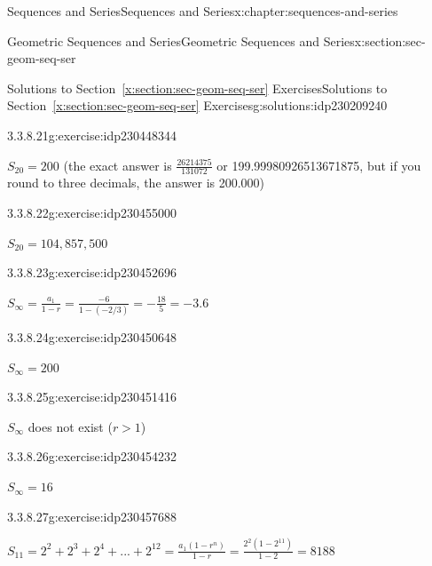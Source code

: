 \documentclass[twoside,10pt,]{book}
\newcommand{\xreffont}{\relax}
\numberwithin{equation}{section}
\newcommand{\infinity}{{\infty}}
\newcommand{\gt}{>}
\begin{document}
\begin{chapterptx}{Sequences and Series}{}{Sequences and Series}{}{}{x:chapter:sequences-and-series}
\begin{sectionptx}{Geometric Sequences and Series}{}{Geometric Sequences and Series}{}{}{x:section:sec-geom-seq-ser}
\begin{solutions-subsection}{Solutions to Section~{\xreffont\ref*{x:section:sec-geom-seq-ser}} Exercises}{}{Solutions to Section~{\xreffont\ref*{x:section:sec-geom-seq-ser}} Exercises}{}{}{g:solutions:idp230209240}
\begin{divisionsolution}{3.3.8.21}{}{g:exercise:idp230448344}%
\par\smallskip%
\noindent\hypertarget{g:solution:idp230450136-main}{}\(S_{20} = 200\) (the exact answer is \(\frac{{26214375}}{{131072}}\) or 199.99980926513671875, but if you round to three decimals, the answer is 200.000)\end{divisionsolution}%
\begin{divisionsolution}{3.3.8.22}{}{g:exercise:idp230455000}%
\par\smallskip%
\noindent\hypertarget{g:solution:idp230448856-main}{}\(S_{20} = 104,857,500\)\end{divisionsolution}%
\begin{exercisegroup}
\begin{divisionsolutioneg}{3.3.8.23}{}{g:exercise:idp230452696}%
\par\smallskip%
\noindent\hypertarget{g:solution:idp230452824-main}{}\({S_\infty } = \frac{{{a_1}}}{{1 - r}} = \frac{{ - 6}}{{1 - \left( { - 2/3} \right)}} =  - \frac{{18}}{5} =  - 3.6\)\end{divisionsolutioneg}%
\begin{divisionsolutioneg}{3.3.8.24}{}{g:exercise:idp230450648}%
\par\smallskip%
\noindent\hypertarget{g:solution:idp230449624-main}{}\(S_\infinity = 200\)\end{divisionsolutioneg}%
\begin{divisionsolutioneg}{3.3.8.25}{}{g:exercise:idp230451416}%
\par\smallskip%
\noindent\hypertarget{g:solution:idp230453080-main}{}\(S_\infinity\) does not exist (\(r \gt 1\))\end{divisionsolutioneg}%
\begin{divisionsolutioneg}{3.3.8.26}{}{g:exercise:idp230454232}%
\par\smallskip%
\noindent\hypertarget{g:solution:idp230447704-main}{}\(S_\infinity = 16\)\end{divisionsolutioneg}%
\end{exercisegroup}
\par\medskip\noindent
\begin{exercisegroup}
\begin{divisionsolutioneg}{3.3.8.27}{}{g:exercise:idp230457688}%
\par\smallskip%
\noindent\hypertarget{g:solution:idp230457816-main}{}\({S_{11}} = {2^2} + {2^3} + {2^4} + ... + {2^{12}} = \frac{{{a_1}(1 - {r^n})}}{{1 - r}} = \frac{{{2^2}(1 - {2^{11}})}}{{1 - 2}}= 8188\)\end{divisionsolutioneg}%

\end{exercisegroup}
\end{solutions-subsection}
\end{sectionptx}
\end{chapterptx}
\end{document}
